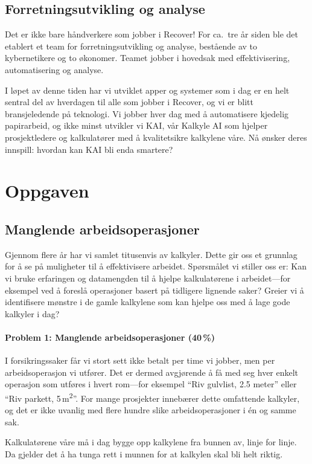 \documentclass[a4paper]{article}
\begin{document}
\subsection{Forretningsutvikling og analyse}
Det er ikke bare håndverkere som jobber i Recover! For ca.\ tre år siden ble det etablert et team for forretningsutvikling og analyse, bestående av to kybernetikere og to økonomer. Teamet jobber i hovedsak med effektivisering, automatisering og analyse.

I løpet av denne tiden har vi utviklet apper og systemer som i dag er en helt sentral del av hverdagen til alle som jobber i Recover, og vi er blitt bransjeledende på teknologi. Vi jobber hver dag med å automatisere kjedelig papirarbeid, og ikke minst utvikler vi KAI, vår Kalkyle AI som hjelper prosjektledere og kalkulatører med å kvalitetsikre kalkylene våre. Nå ønsker deres innspill: hvordan kan KAI bli enda smartere?

\section{Oppgaven}

\subsection{Manglende arbeidsoperasjoner}
Gjennom flere år har vi samlet titusenvis av kalkyler. Dette gir oss et grunnlag for å se på muligheter til å effektivisere arbeidet. Spørsmålet vi stiller oss er: Kan vi bruke erfaringen og datamengden til å hjelpe kalkulatørene i arbeidet---for eksempel ved å foreslå operasjoner basert på tidligere lignende saker? Greier vi å identifisere mønstre i de gamle kalkylene som kan hjelpe oss med å lage gode kalkyler i dag?

\paragraph{Problem 1: Manglende arbeidsoperasjoner (40\,\%)}
I forsikringssaker får vi stort sett ikke betalt per time vi jobber, men per arbeidsoperasjon vi utfører. Det er dermed avgjørende å få med seg hver enkelt operasjon som utføres i hvert rom---for eksempel ``Riv gulvlist, 2.5 meter'' eller ``Riv parkett, 5\,m\textsuperscript{2}''. For mange prosjekter innebærer dette omfattende kalkyler, og det er ikke uvanlig med flere hundre slike arbeidsoperasjoner i én og samme sak.

Kalkulatørene våre må i dag bygge opp kalkylene fra bunnen av, linje for linje. Da gjelder det å ha tunga rett i munnen for at kalkylen skal bli helt riktig.
\end{document}
